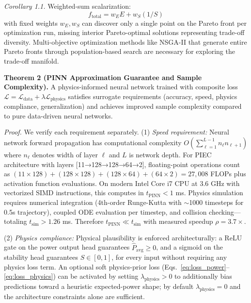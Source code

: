 \documentclass[pdflatex,sn-nature]{sn-jnl}%
\begin{document}
\textit{Corollary 1.1.} Weighted-sum scalarization:
\begin{equation}
f_{\text{total}} = w_E E + w_S (1/S)
\label{eq:weighted_sum}
\end{equation}
with fixed weights $w_E, w_S$ can discover only a single point on the Pareto front per optimization run, missing interior Pareto-optimal solutions representing trade-off diversity. Multi-objective optimization methods like NSGA-II that generate entire Pareto fronts through population-based search are necessary for exploring the trade-off manifold.

\textbf{Theorem 2 (PINN Approximation Guarantee and Sample Complexity).} A physics-informed neural network trained with composite loss $\mathcal{L} = \mathcal{L}_{\text{data}} + \lambda \mathcal{L}_{\text{physics}}$ satisfies surrogate requirements (accuracy, speed, physics compliance, generalization) and achieves improved sample complexity compared to pure data-driven neural networks.

\textit{Proof.} We verify each requirement separately. (1) \textit{Speed requirement:} Neural network forward propagation has computational complexity $O(\sum_{\ell=1}^{L-1} n_\ell n_{\ell+1})$ where $n_\ell$ denotes width of layer $\ell$ and $L$ is network depth. For PIEC architecture with layers [11→128→128→64→2], floating-point operations count as $(11 \times 128) + (128 \times 128) + (128 \times 64) + (64 \times 2) = 27,008$ FLOPs plus activation function evaluations. On modern Intel Core i7 CPU at 3.6 GHz with vectorized SIMD instructions, this computes in $t_{\text{PINN}} < 1$ ms. Physics simulation requires numerical integration (4th-order Runge-Kutta with $\sim$1000 timesteps for 0.5s trajectory), coupled ODE evaluation per timestep, and collision checking—totaling $t_{\text{sim}} > 1.26$ ms. Therefore $t_{\text{PINN}} \ll t_{\text{sim}}$ with measured speedup $\rho = 3.7\times$.

(2) \textit{Physics compliance:} Physical plausibility is enforced architecturally: a ReLU gate on the power output head guarantees $\hat{P}_{\text{avg}} \geq 0$, and a sigmoid on the stability head guarantees $S \in [0,1]$, for every input without requiring any physics loss term. An optional soft physics-prior loss (Eqs.~\ref{eq:loss_power}--\ref{eq:loss_physics}) can be activated by setting $\lambda_{\text{physics}} > 0$ to additionally bias predictions toward a heuristic expected-power shape; by default $\lambda_{\text{physics}} = 0$ and the architecture constraints alone are sufficient.
\end{document}
